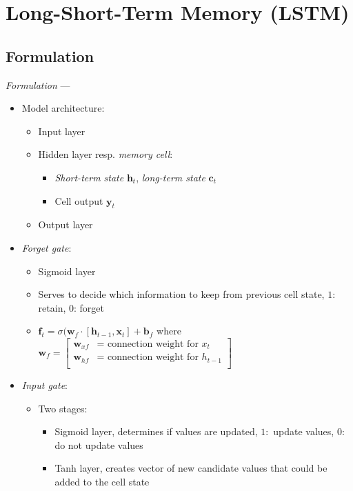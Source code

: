 \section{Long-Short-Term Memory (LSTM)}
\subsection*{Formulation}
\emph{Formulation} --- 
\begin{itemize}
    \item Model architecture: 
    \begin{itemize}
        \item Input layer
        \item Hidden layer resp. \emph{memory cell}: 
        \begin{itemize}
            \item \emph{Short-term state} $\boldsymbol{h}_t$, \emph{long-term state} $\boldsymbol{c}_t$
            \item Cell output $\boldsymbol{y}_t$
        \end{itemize}
        \item Output layer
    \end{itemize}
    \item \emph{Forget gate}:
    \begin{itemize}
        \item Sigmoid layer
        \item Serves to decide which information to keep from previous cell state, $1:$ retain, $0$: forget
        \item $\boldsymbol{f}_t = \sigma (\boldsymbol{w}_f \cdot [ \boldsymbol{h}_{t-1}, \boldsymbol{x}_t ] + \boldsymbol{b}_f $ where $\boldsymbol{w}_f = \begin{bmatrix}
        \boldsymbol{w}_{xf} & \textrm{= connection weight for } x_t \\
        \boldsymbol{w}_{hf} & \textrm{= connection weight for } h_{t-1} \\
        \end{bmatrix}$
    \end{itemize}
    \item \emph{Input gate}:
    \begin{itemize}
        \item Two stages:
        \begin{itemize}
            \item Sigmoid layer, determines if values are updated, $1:$ update values, $0$: do not update values
            \item Tanh layer, creates vector of new candidate values that could be added to the cell state

\end{itemize}
\end{itemize}
\end{itemize}
